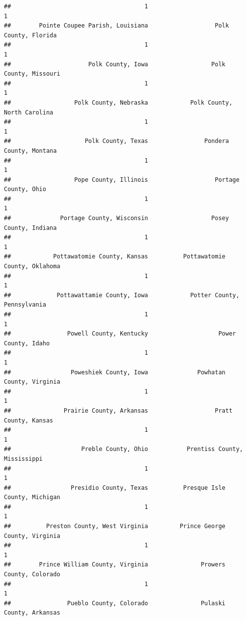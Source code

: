 \documentclass[
]{article}
\begin{document}
\begin{verbatim}
##                                      1                                      1 
##        Pointe Coupee Parish, Louisiana                   Polk County, Florida 
##                                      1                                      1 
##                      Polk County, Iowa                  Polk County, Missouri 
##                                      1                                      1 
##                  Polk County, Nebraska            Polk County, North Carolina 
##                                      1                                      1 
##                     Polk County, Texas                Pondera County, Montana 
##                                      1                                      1 
##                  Pope County, Illinois                   Portage County, Ohio 
##                                      1                                      1 
##              Portage County, Wisconsin                  Posey County, Indiana 
##                                      1                                      1 
##            Pottawatomie County, Kansas          Pottawatomie County, Oklahoma 
##                                      1                                      1 
##             Pottawattamie County, Iowa            Potter County, Pennsylvania 
##                                      1                                      1 
##                Powell County, Kentucky                    Power County, Idaho 
##                                      1                                      1 
##                 Poweshiek County, Iowa              Powhatan County, Virginia 
##                                      1                                      1 
##               Prairie County, Arkansas                   Pratt County, Kansas 
##                                      1                                      1 
##                    Preble County, Ohio           Prentiss County, Mississippi 
##                                      1                                      1 
##                 Presidio County, Texas          Presque Isle County, Michigan 
##                                      1                                      1 
##          Preston County, West Virginia         Prince George County, Virginia 
##                                      1                                      1 
##        Prince William County, Virginia               Prowers County, Colorado 
##                                      1                                      1 
##                Pueblo County, Colorado               Pulaski County, Arkansas 

\end{verbatim}
\end{document}
